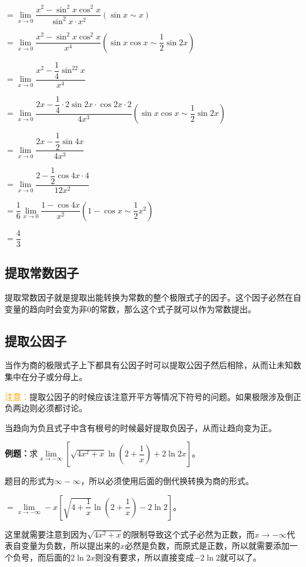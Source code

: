 \documentclass[UTF8, 12pt]{ctexart}
\begin{document}
$= \lim\limits_{x\to 0}\dfrac{x^2-\sin^2x\cos^2x}{\sin^2x\cdot x^2} (\sin x\sim x)$ \medskip

$= \lim\limits_{x\to 0}\dfrac{x^2-\sin^2x\cos^2x}{x^4} (\sin x\cos x\sim\dfrac{1}{2}\sin 2x)$ \medskip

$= \lim\limits_{x\to 0}\dfrac{x^2-\dfrac{1}{4}\sin^22x}{x^4}$ \medskip

$= \lim\limits_{x\to 0}\dfrac{2x-\dfrac{1}{4}\cdot 2\sin 2x\cdot\cos 2x\cdot 2}{4x^3} (\sin x\cos x\sim\dfrac{1}{2}\sin 2x)$ \medskip

$= \lim\limits_{x\to 0}\dfrac{2x-\dfrac{1}{2}\sin 4x}{4x^3}$ \medskip

$= \lim\limits_{x\to 0}\dfrac{2-\dfrac{1}{2}\cos 4x\cdot 4}{12x^2}$ \medskip

$= \dfrac{1}{6}\lim\limits_{x\to 0}\dfrac{1-\cos 4x}{x^2} (1-\cos x\sim \dfrac{1}{2}x^2)$ \medskip

$= \dfrac{4}{3}$

\subsection{提取常数因子}

提取常数因子就是提取出能转换为常数的整个极限式子的因子。这个因子必然在自变量的趋向时会变为非0的常数，那么这个式子就可以作为常数提出。

\subsection{提取公因子}

当作为商的极限式子上下都具有公因子时可以提取公因子然后相除，从而让未知数集中在分子或分母上。

\textcolor{orange}{注意：}提取公因子的时候应该注意开平方等情况下符号的问题。如果极限涉及倒正负两边则必须都讨论。

当趋向为负且式子中含有根号的时候最好提取负因子，从而让趋向变为正。\medskip

\textbf{例题：}求$\lim\limits_{x\to-\infty}\left[\sqrt{4x^2+x}\ln\left(2+\dfrac{1}{x}\right)+2\ln 2x\right]$。\medskip

题目的形式为$\infty-\infty$，所以必须使用后面的倒代换转换为商的形式。\medskip

$=\lim\limits_{x\to-\infty}-x\left[\sqrt{4+\dfrac{1}{x}}\ln\left(2+\dfrac{1}{x}\right)-2\ln 2\right]$。 \medskip

这里就需要注意到因为$\sqrt{4x^2+x}$的限制导致这个式子必然为正数，而$x\to-\infty$代表自变量为负数，所以提出来的$x$必然是负数，而原式是正数，所以就需要添加一个负号，而后面的$2\ln 2x$则没有要求，所以直接变成$-2\ln 2$就可以了。
\end{document}
